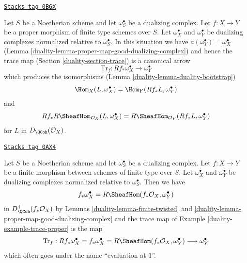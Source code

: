 \begin{example}
\label{duality-example-trace-proper}
\href{https://stacks.math.columbia.edu/tag/0B6X}{\texttt{Stacks tag 0B6X}}

Let $S$ be a Noetherian scheme and let $\omega_S^\bullet$ be a
dualizing complex. Let $f : X \to Y$ be a proper morphism of finite
type schemes over $S$. Let $\omega_X^\bullet$ and $\omega_Y^\bullet$
be dualizing complexes normalized relative to $\omega_S^\bullet$.
In this situation we have $a(\omega_Y^\bullet) = \omega_X^\bullet$
(Lemma \ref{duality-lemma-proper-map-good-dualizing-complex})
and hence the trace map (Section \ref{duality-section-trace}) is a canonical arrow
$$
\text{Tr}_f : Rf_*\omega_X^\bullet \longrightarrow \omega_Y^\bullet
$$
which produces the isomorphisms (Lemma \ref{duality-lemma-duality-bootstrap})
$$
\Hom_X(L, \omega_X^\bullet) = \Hom_Y(Rf_*L, \omega_Y^\bullet)
$$
and
$$
Rf_*R\SheafHom_{\mathcal{O}_X}(L, \omega_X^\bullet) =
R\SheafHom_{\mathcal{O}_Y}(Rf_*L, \omega_Y^\bullet)
$$
for $L$ in $D_\QCoh(\mathcal{O}_X)$.
\end{example}

\begin{remark}
\label{duality-remark-dualizing-finite}
\href{https://stacks.math.columbia.edu/tag/0AX4}{\texttt{Stacks tag 0AX4}}

Let $S$ be a Noetherian scheme and let $\omega_S^\bullet$ be a dualizing
complex. Let $f : X \to Y$ be a finite morphism between schemes of finite
type over $S$. Let $\omega_X^\bullet$ and $\omega_Y^\bullet$ be
dualizing complexes normalized relative to $\omega_S^\bullet$.
Then we have
$$
f_*\omega_X^\bullet = R\SheafHom(f_*\mathcal{O}_X, \omega_Y^\bullet)
$$
in $D_\QCoh^+(f_*\mathcal{O}_X)$ by Lemmas \ref{duality-lemma-finite-twisted} and
\ref{duality-lemma-proper-map-good-dualizing-complex}
and the trace map of Example \ref{duality-example-trace-proper} is the map
$$
\text{Tr}_f : Rf_*\omega_X^\bullet = f_*\omega_X^\bullet =
R\SheafHom(f_*\mathcal{O}_X, \omega_Y^\bullet) \longrightarrow
\omega_Y^\bullet
$$
which often goes under the name ``evaluation at $1$''.
\end{remark}

